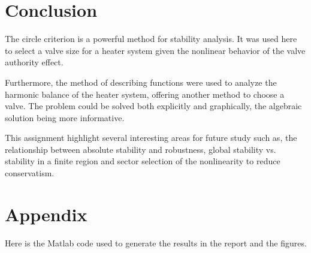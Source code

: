 \documentclass[a4paper, titlepage]{article}
\begin{document}
 
\section{Conclusion}
The circle criterion is a powerful method for stability analysis.
It was used here to select a valve size for a heater system given the nonlinear behavior of the valve authority effect.

Furthermore, the method of describing functions were used to analyze the harmonic balance of the heater system, offering another method to choose a valve.
The problem could be solved both explicitly and graphically, the algebraic solution being more informative.

This assignment highlight several interesting areas for future study such as, the relationship between absolute stability and robustness, global stability vs. stability in a finite region and sector selection of the nonlinearity to reduce conservatism.   



%
%


\clearpage


\clearpage
\appendix

\section{Appendix}
Here is the Matlab code used to generate the results in the report and the figures.


\end{document}
